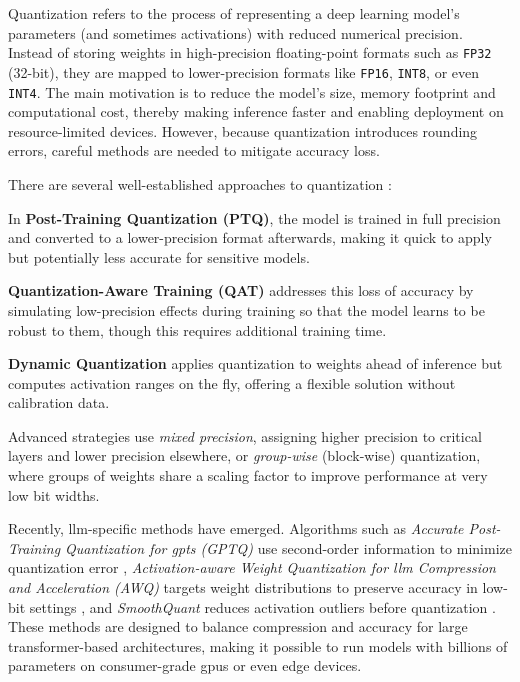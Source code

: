 Quantization refers to the process of representing a deep learning model's parameters (and sometimes activations) with reduced numerical precision. Instead of storing weights in high-precision floating-point formats such as \texttt{FP32} (32-bit), they are mapped to lower-precision formats like \texttt{FP16}, \texttt{INT8}, or even \texttt{INT4}. The main motivation is to reduce the model's size, memory footprint and computational cost, thereby making inference faster and enabling deployment on resource-limited devices. However, because quantization introduces rounding errors, careful methods are needed to mitigate accuracy loss.

There are several well-established approaches to quantization \cite{QUANTIZATION}:
\begin{compactitem}[\textbullet]
    \item In \textbf{Post-Training Quantization (PTQ)}, the model is trained in full precision and converted to a lower-precision format afterwards, making it quick to apply but potentially less accurate for sensitive models.
    \item \textbf{Quantization-Aware Training (QAT)} addresses this loss of accuracy by simulating low-precision effects during training so that the model learns to be robust to them, though this requires additional training time.
    \item \textbf{Dynamic Quantization} applies quantization to weights ahead of inference but computes activation ranges on the fly, offering a flexible solution without calibration data.
    \item Advanced strategies use \textit{mixed precision}, assigning higher precision to critical layers and lower precision elsewhere, or \textit{group-wise} (block-wise) quantization, where groups of weights share a scaling factor to improve performance at very low bit widths.
\end{compactitem}

Recently, \ac{llm}-specific methods have emerged. Algorithms such as \textit{Accurate Post-Training Quantization for \aclp{gpt} (GPTQ)} use second-order information to minimize quantization error \cite{GPTQ}, \textit{Activation-aware Weight Quantization for \ac{llm} Compression and Acceleration (AWQ)} targets weight distributions to preserve accuracy in low-bit settings \cite{AWQ}, and \textit{SmoothQuant} reduces activation outliers before quantization \cite{SMOOTHQUANT}. These methods are designed to balance compression and accuracy for large transformer-based architectures, making it possible to run models with billions of parameters on consumer-grade \acp{gpu} or even edge devices.
